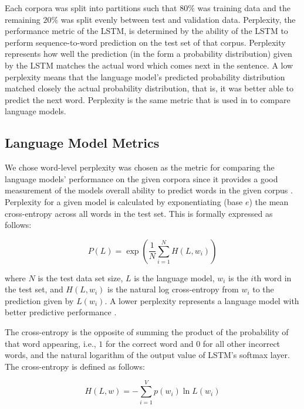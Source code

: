 \documentclass[runningheads,a4paper]{llncs}
\begin{document}

Each corpora was split into partitions such that $80\%$ was training data
and the remaining $20\%$ was split evenly between test and validation
data. Perplexity, the performance metric of the LSTM, is determined by the
ability of the LSTM to perform sequence-to-word prediction on the test
set of that corpus. Perplexity represents how well the prediction (in the
form a probability distribution) given by the LSTM matches the actual
word which comes next in the sentence. A low perplexity means that the
language model's predicted probability distribution matched closely the
actual probability distribution, that is, it was better able to predict
the next word. Perplexity is the same metric that is used in
\citet{LSTMArticle} to compare language models.

\subsection{Language Model Metrics}

We chose word-level perplexity was chosen as the metric for comparing the
language models' performance on the given corpora since it provides
a good measurement of the models overall ability to predict words
in the given corpus \cite{sundermeyer2015feedforward}. 
Perplexity for a given model is calculated
by exponentiating (base $e$) the mean
cross-entropy across all words in the test set. This is formally
expressed as follows:

\begin{equation}
\label{perplexity}
    P(L) = \exp\left(\frac{1}{N}\sum^{N}_{i=1} H(L,w_i)\right)
\end{equation}

where $N$ is the test data set size, $L$ is the language model, $w_i$
is the $i$th word in the test set, and $H(L, w_i)$ is the natural log
cross-entropy from $w_i$ to the prediction given by $L(w_i)$. A lower
perplexity represents a language model with better predictive
performance \cite{wang2016parallel}.

The cross-entropy is the opposite of summing the
product of the probability of that word appearing, i.e., $1$ for the
correct word and $0$ for all other incorrect words, and the
natural logarithm of the output value of LSTM's softmax layer.
The cross-entropy is defined as follows:

\begin{equation}
\label{cross-entropy}
    H(L,w) = - \sum_{i=1}^V p(w_i) \ln L(w_i)
\end{equation}
\end{document}
